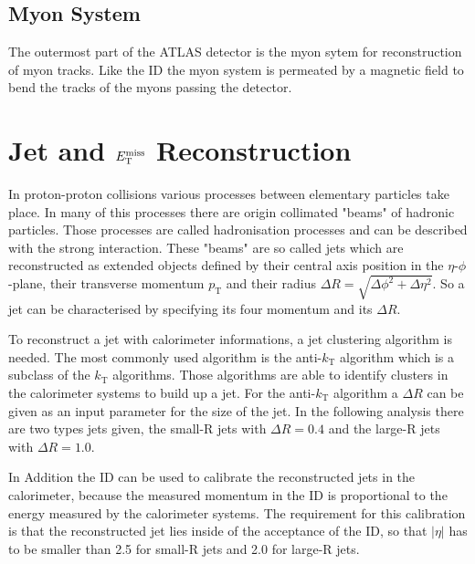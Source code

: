 \subsection{Myon System}
The outermost part of the ATLAS detector is the myon sytem for reconstruction of myon tracks.
Like the ID the myon system is permeated by a magnetic field to bend the tracks of the myons passing the detector.
\section{Jet and $\boldmath E_{\mathrm{T}}^{\mathrm{miss}}\unboldmath$ Reconstruction}
In proton-proton collisions various processes between elementary particles take place.
In many of this processes there are origin collimated "beams" of hadronic particles.
Those processes are called hadronisation processes and can be described with the strong interaction.
These "beams" are so called jets which are reconstructed as extended objects defined by their central axis position in the $\eta$-$\phi$-plane, their transverse momentum $p_{\text{T}}$ and their radius $\Delta R = \sqrt{\Delta\phi^2 + \Delta\eta^2}$.
So a jet can be characterised by specifying its four momentum and its $\Delta R$.

To reconstruct a jet with calorimeter informations, a jet clustering algorithm is needed.
The most commonly used algorithm is the anti-$k_{\text{T}}$ algorithm which is a subclass of the $k_{\text{T}}$ algorithms.
Those algorithms are able to identify clusters in the calorimeter systems to build up a jet.
For the anti-$k_{\text{T}}$ algorithm a $\Delta R$ can be given as an input parameter for the size of the jet.
In the following analysis there are two types jets given, the small-R jets with $\Delta R = 0.4$ and the large-R jets with $\Delta R = 1.0$.

In Addition the ID can be used to calibrate the reconstructed jets in the calorimeter, because the measured momentum in the ID is proportional to the energy measured by the calorimeter systems.
The requirement for this calibration is that the reconstructed jet lies inside of the acceptance of the ID, so that $|\eta|$ has to be smaller than 2.5 for small-R jets and 2.0 for large-R jets.

